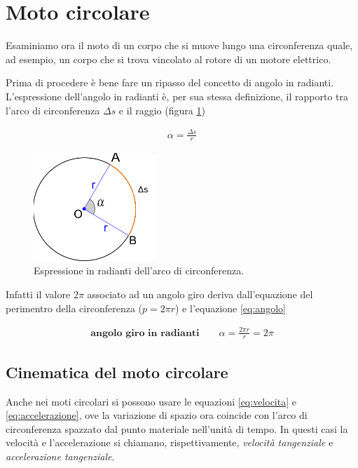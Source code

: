 \documentclass[17pt]{extarticle}
\begin{document}
\section{Moto circolare}



Esaminiamo ora il moto di un corpo che si muove lungo una circonferenza quale, ad esempio, un corpo che si trova vincolato al rotore di un motore elettrico.  

Prima di procedere è bene fare un ripasso del concetto di angolo in radianti.\\
L'espressione dell'angolo in radianti è, per sua stessa definizione, il rapporto tra l'arco di circonferenza $\Delta s$ e il raggio (figura \ref{fig:arcoCirconferenza})

\begin{eqnarray}\label{eq:angolo}
	\alpha = \frac{\Delta s}{r}
\end{eqnarray}






\begin{figure}[h!]		
	\centering
   	\includegraphics[width=1.8in]{arcoCirconferenza.png}%
  	\caption{Espressione in radianti dell'arco di circonferenza.}
   	\label{fig:arcoCirconferenza}
\end{figure}


Infatti il valore $2\pi$ associato ad un angolo giro deriva dall'equazione del perimentro della circonferenza ($p = 2\pi r$) e l'equazione \ref{eq:angolo} 



\begin{eqnarray}
	\textbf{angolo giro in radianti}\qquad \alpha = \frac{2\pi r}{r} = 2\pi
\end{eqnarray}


\subsection{Cinematica del moto circolare}
Anche nei moti circolari si possono usare le equazioni \ref{eq:velocita} e \ref{eq:accelerazione}, ove la variazione di spazio ora coincide con l'arco di circonferenza spazzato dal punto materiale nell'unità di tempo. In questi casi la velocità e l'accelerazione si chiamano, rispettivamente, \emph{velocità tangenziale} e \emph{accelerazione tangenziale}.
\end{document}
